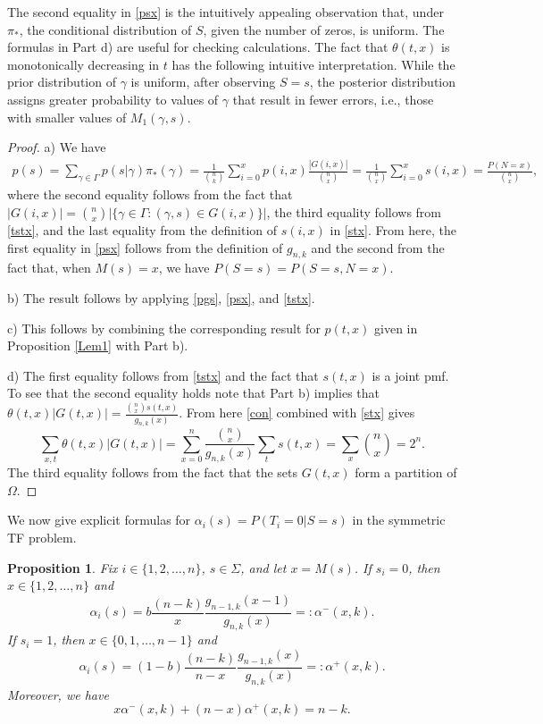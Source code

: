 \documentclass[a4paper,11pt]{article}
\newtheorem{prop}{Proposition}
\begin{document}
The second equality in \eqref{psx} is the intuitively appealing observation that, under $\pi_*$, the conditional distribution of $S$, given the number of zeros, is uniform. The formulas in Part d) are useful for checking calculations. The fact that $\theta(t,x)$ is monotonically decreasing in $t$ has the following intuitive interpretation. While the prior distribution of $\gamma$ is uniform, after observing $S=s$, the posterior distribution assigns greater probability to values of $\gamma$ that result in fewer errors, i.e., those with smaller values of $M_1(\gamma,s)$.

\begin{proof}
a) We have
\begin{eqnarray*}
p(s) = \sum_{\gamma\in\Gamma}p(s|\gamma)\pi_*(\gamma) = \frac{1}{{n\choose k}}\sum_{i=0}^x p(i,x)\frac{|G(i,x)|}{{n\choose x}} = \frac{1}{{n\choose x}}\sum_{i=0}^x s(i,x) = \frac{P(N=x)}{{n\choose x}},
\end{eqnarray*}
where the second equality follows from the fact that $|G(i,x)|={n\choose x}|\{\gamma\in\Gamma:(\gamma,s)\in G(i,x)\}|$, the third equality follows from \eqref{tstx}, and the last equality from the definition of $s(i,x)$ in \eqref{stx}. From here, the first equality in \eqref{psx} follows from the definition of $g_{n,k}$ and the second from the fact that, when $M(s)=x$, we have $P(S=s) = P(S=s, N=x)$. 

b) The result follows by applying \eqref{pgs}, \eqref{psx}, and \eqref{tstx}.

c) This follows by combining the corresponding result for $p(t,x)$ given in Proposition \ref{Lem1} with Part b).

d) The first equality follows from \eqref{tstx} and the fact that $s(t,x)$ is a joint pmf. To see that the second equality holds note that Part b) implies that $\theta(t,x)|G(t,x)|=\frac{{n\choose x}s(t,x)}{g_{n,k}(x)}$. From here \eqref{con} combined with \eqref{stx} gives
$$
\sum_{x,t}\theta(t,x)|G(t,x)| = \sum_{x=0}^n \frac{{n\choose x}}{g_{n,k}(x)} \sum_{t}s(t,x) = \sum_x {n\choose x}=2^n.
$$
The third equality follows from the fact that the sets $G(t,x)$ form a partition of $\Omega$.
\end{proof}

We now give explicit formulas for $\alpha_i(s)=P(T_i=0|S=s)$ in the symmetric TF problem.

\begin{prop}\label{Lem2}
Fix $i\in\{1,2,\dots,n\}$, $s\in \Sigma$, and let $x=M(s)$. If $s_i=0$, then $x\in\{1,2,\dots,n\}$ and
$$
\alpha_i(s) =b \frac{(n-k)}{x}\frac{g_{n-1,k}(x-1)}{g_{n,k}(x)}=:\alpha^-(x,k).
$$
If $s_i=1$, then $x\in\{0,1,\dots,n-1\}$ and
$$
\alpha_i(s) = (1-b)\frac{(n-k)}{n-x}\frac{g_{n-1,k}(x)}{g_{n,k}(x)}=: \alpha^+(x,k).
$$
Moreover, we have
$$
x  \alpha^-(x,k) + (n-x) \alpha^+(x,k) = n-k.
$$
\end{prop}
\end{document}
